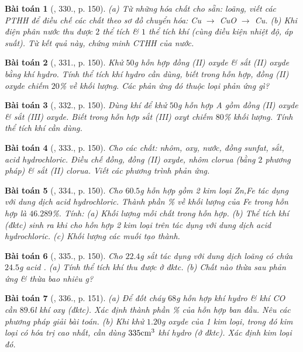 \documentclass{article}
\newtheorem{baitoan}{Bài toán}
\begin{document}
\begin{baitoan}[\cite{An_400_BT_Hoa_Hoc_8_2020}, 330., p. 150]
	(a) Từ những hóa chất cho sẵn: \emph{} loãng, viết các PTHH để điều chế các chất theo sơ đồ chuyển hóa: \emph{Cu $\to$ CuO $\to$ Cu}. (b) Khi điện phân nước thu được $2$ thể tích \emph{} \& $1$ thể tích khí \emph{} (cùng điều kiện nhiệt độ, áp suất). Từ kết quả này, chứng minh CTHH của nước.
\end{baitoan}

\begin{baitoan}[\cite{An_400_BT_Hoa_Hoc_8_2020}, 331., p. 150]
	Khử $50$\emph{g} hỗn hợp đồng (II) oxyde \& sắt (II) oxyde bằng khí hydro. Tính thể tích khí hydro cần dùng, biết trong hỗn hợp, đồng (II) oxyde chiếm $20$\% về khối lượng. Các phản ứng đó thuộc loại phản ứng gì?
\end{baitoan}

\begin{baitoan}[\cite{An_400_BT_Hoa_Hoc_8_2020}, 332., p. 150]
	Dùng khí \emph{} để khử $50$\emph{g} hỗn hợp A gồm đồng (II) oxyde \& sắt (III) oxyde. Biết trong hỗn hợp sắt (III) oxyt chiếm $80$\% khối lượng. Tính thể tích khí \emph{} cần dùng.
\end{baitoan}

\begin{baitoan}[\cite{An_400_BT_Hoa_Hoc_8_2020}, 333., p. 150]
	Cho các chất: nhôm, oxy, nước, đồng sunfat, sắt, acid hydrochloric. Điều chế đồng, đồng (II) oxyde, nhôm clorua (bằng $2$ phương pháp) \& sắt (II) clorua. Viết các phương trình phản ứng.
\end{baitoan}

\begin{baitoan}[\cite{An_400_BT_Hoa_Hoc_8_2020}, 334., p. 150]
	Cho $60.5$\emph{g} hỗn hợp gồm 2 kim loại \emph{Zn,Fe} tác dụng với dung dịch acid hydrochloric. Thành phần \% về khối lượng của \emph{Fe} trong hỗn hợp là $46.289$\%. Tính: (a) Khối lượng mỗi chất trong hỗn hợp. (b) Thể tích khí \emph{} (đktc) sinh ra khi cho hỗn hợp 2 kim loại trên tác dụng với dung dịch acid hydrochloric. (c) Khối lượng các muối tạo thành.
\end{baitoan}

\begin{baitoan}[\cite{An_400_BT_Hoa_Hoc_8_2020}, 335., p. 150]
	Cho $22.4$\emph{g} sắt tác dụng với dung dịch loãng có chứa $24.5$\emph{g} acid \emph{}. (a) Tính thể tích khí \emph{} thu được ở đktc. (b) Chất nào thừa sau phản ứng \& thừa bao nhiêu \emph{g}?	
\end{baitoan}

\begin{baitoan}[\cite{An_400_BT_Hoa_Hoc_8_2020}, 336., p. 151]
	(a) Để đốt cháy $68$\emph{g} hỗn hợp khí hydro \& khí \emph{CO} cần $89.6$\emph{l} khí oxy (đktc). Xác định thành phần \% của hỗn hợp ban đầu. Nêu các phương pháp giải bài toán. (b) Khi khử $1.20$\emph{g} oxyde của 1 kim loại, trong đó kim loại có hóa trị cao nhất, cần dùng $\rm335cm^3$ khí hydro (ở đktc). Xác định kim loại đó.
\end{baitoan}


\printbibliography[heading=bibintoc]
	
\end{document}
